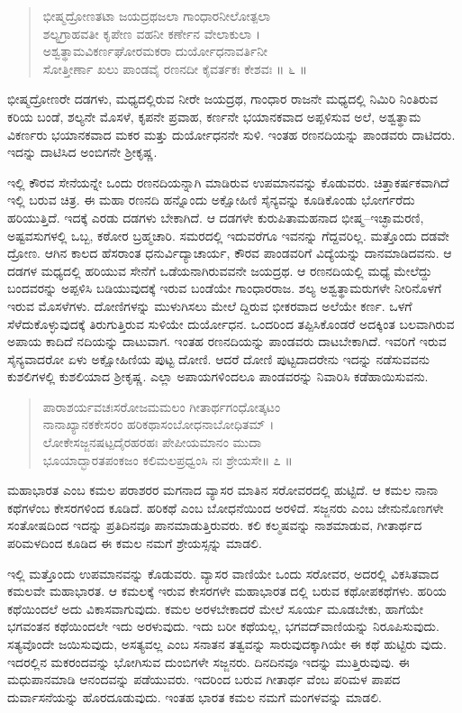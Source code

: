 \begin{verse}
ಭೀಷ್ಮದ್ರೋಣತಟಾ ಜಯದ್ರಥಜಲಾ ಗಾಂಧಾರನೀಲೋತ್ಪಲಾ\\ಶಲ್ಯಗ್ರಾಹವತೀ ಕೃಪೇಣ ವಹನೀ ಕರ್ಣೇನ ವೇಲಾಕುಲಾ ।\\ಅಶ್ವತ್ಥಾಮವಿಕರ್ಣಘೋರಮಕರಾ ದುರ್ಯೋಧನಾವರ್ತಿನೀ\\ಸೋತ್ತೀರ್ಣಾ ಖಲು ಪಾಂಡವೈ ರಣನದೀ ಕೈವರ್ತಕಃ ಕೇಶವಃ \num{॥ ೬ ॥}
\end{verse}

{\small ಭೀಷ್ಮದ್ರೋಣರೇ ದಡಗಳು, ಮಧ್ಯದಲ್ಲಿರುವ ನೀರೇ ಜಯದ್ರಥ, ಗಾಂಧಾರ ರಾಜನೇ ಮಧ್ಯದಲ್ಲಿ ನಿಮಿರಿ ನಿಂತಿರುವ ಕರಿಯ ಬಂಡೆ, ಶಲ್ಯನೇ ಮೊಸಳೆ, ಕೃಪನೇ ಪ್ರವಾಹ, ಕರ್ಣನೇ ಭಯಾನಕವಾದ ಅಪ್ಪಳಿಸುವ ಅಲೆ, ಅಶ್ವತ್ಥಾಮ ವಿಕರ್ಣರು ಭಯಾನಕವಾದ ಮಕರ ಮತ್ತು ದುರ್ಯೋಧನನೇ ಸುಳಿ. ಇಂತಹ ರಣನದಿಯನ್ನು ಪಾಂಡವರು ದಾಟಿದರು. ಇದನ್ನು ದಾಟಿಸಿದ ಅಂಬಿಗನೇ ಶ್ರೀಕೃಷ್ಣ.}

ಇಲ್ಲಿ ಕೌರವ ಸೇನೆಯನ್ನೇ ಒಂದು ರಣನದಿಯನ್ನಾಗಿ ಮಾಡಿರುವ ಉಪಮಾನವನ್ನು ಕೊಡುವರು. ಚಿತ್ತಾಕರ್ಷಕವಾಗಿದೆ ಇಲ್ಲಿ ಬರುವ ಚಿತ್ರ. ಈ ಮಹಾ ರಣನದಿ ಹನ್ನೊಂದು ಅಕ್ಷೋಹಿಣಿ ಸೈನ್ಯವನ್ನು ಕೂಡಿಕೊಂಡು ಭೋರ್ಗರೆದು ಹರಿಯುತ್ತಿದೆ. ಇದಕ್ಕೆ ಎರಡು ದಡಗಳು ಬೇಕಾಗಿದೆ. ಆ ದಡಗಳೇ ಕುರುಪಿತಾಮಹನಾದ ಭೀಷ್ಮ–ಇಚ್ಛಾಮರಣಿ, ಅಷ್ಟವಸುಗಳಲ್ಲಿ ಒಬ್ಬ, ಕಠೋರ ಬ್ರಹ್ಮಚಾರಿ. ಸಮರದಲ್ಲಿ ಇದುವರೆಗೂ ಇವನನ್ನು ಗೆದ್ದವರಿಲ್ಲ. ಮತ್ತೊಂದು ದಡವೇ ದ್ರೋಣ. ಆಗಿನ ಕಾಲದ ಹೆಸರಾಂತ ಧನುರ್ವಿದ್ಯಾಚಾರ್ಯ, ಕೌರವ ಪಾಂಡವರಿಗೆ ವಿದ್ಯೆಯನ್ನು ದಾನಮಾಡಿದವನು. ಆ ದಡಗಳ ಮಧ್ಯದಲ್ಲಿ ಹರಿಯುವ ಸೇನೆಗೆ ಒಡೆಯನಾಗಿರುವವನೇ ಜಯದ್ರಥ. ಆ ರಣನದಿಯಲ್ಲಿ ಮಧ್ಯೆ ಮೇಲೆದ್ದು ಬಂದವರನ್ನು ಅಪ್ಪಳಿಸಿ ಬಡಿಯುವುದಕ್ಕೆ ಇರುವ ಬಂಡೆಯೇ ಗಾಂಧಾರರಾಜ. ಶಲ್ಯ ಅಶ್ವತ್ಥಾಮರುಗಳೇ ನೀರಿನೊಳಗೆ ಇರುವ ಮೊಸಳೆಗಳು. ದೋಣಿಗಳನ್ನು ಮುಳುಗಿಸಲು ಮೇಲೆ ದ್ದಿರುವ ಭೀಕರವಾದ ಅಲೆಯೇ ಕರ್ಣ. ಒಳಗೆ ಸೆಳೆದುಕೊಳ್ಳುವುದಕ್ಕೆ ತಿರುಗುತ್ತಿರುವ ಸುಳಿಯೇ ದುರ್ಯೋಧನ. ಒಂದರಿಂದ ತಪ್ಪಿಸಿಕೊಂಡರೆ ಅದಕ್ಕಿಂತ ಬಲವಾಗಿರುವ ಅಪಾಯ ಕಾದಿದೆ ನದಿಯನ್ನು ದಾಟುವಾಗ. ಇಂತಹ ರಣನದಿಯನ್ನು ಪಾಂಡವರು ದಾಟಬೇಕಾಗಿದೆ. ಇವರಿಗೆ ಇರುವ ಸೈನ್ಯವಾದರೋ ಏಳು ಅಕ್ಷೋಹಿಣಿಯ ಪುಟ್ಟ ದೋಣಿ. ಆದರೆ ದೋಣಿ ಪುಟ್ಟದಾದರೇನು ಇದನ್ನು ನಡೆಸುವವನು ಕುಶಲಿಗಳಲ್ಲಿ ಕುಶಲಿಯಾದ ಶ್ರೀಕೃಷ್ಣ. ಎಲ್ಲಾ ಅಪಾಯಗಳಿಂದಲೂ ಪಾಂಡವರನ್ನು ನಿವಾರಿಸಿ ಕಡೆಹಾಯಿಸುವನು.

\begin{verse}
ಪಾರಾಶರ್ಯವಚಃಸರೋಜಮಮಲಂ ಗೀತಾರ್ಥಗಂಧೋತ್ಕಟಂ\\ನಾನಾಖ್ಯಾನಕಕೇಸರಂ ಹರಿಕಥಾಸಂಬೋಧನಾಬೋಧಿತಮ್ ।\\ಲೋಕೇಸಜ್ಜನಷಟ್ಪದೈರಹರಹಃ ಪೇಪೀಯಮಾನಂ ಮುದಾ\\ಭೂಯಾದ್ಭಾರತಪಂಕಜಂ ಕಲಿಮಲಪ್ರಧ್ವಂಸಿ ನಃ ಶ್ರೇಯಸೇ\num{॥ ೭ ॥}
\end{verse}

{\small ಮಹಾಭಾರತ ಎಂಬ ಕಮಲ ಪರಾಶರರ ಮಗನಾದ ವ್ಯಾಸರ ಮಾತಿನ ಸರೋವರದಲ್ಲಿ ಹುಟ್ಟಿದೆ. ಆ ಕಮಲ ನಾನಾ ಕಥೆಗಳೆಂಬ ಕೇಸರಗಳಿಂದ ಕೂಡಿದೆ. ಹರಿಕಥೆ ಎಂಬ ಬೋಧನೆಯಿಂದ ಅರಳಿದೆ. ಸಜ್ಜನರು ಎಂಬ ಜೇನುನೊಣಗಳೇ ಸಂತೋಷದಿಂದ ಇದನ್ನು ಪ್ರತಿದಿನವೂ ಪಾನಮಾಡುತ್ತಿರುವರು. ಕಲಿ ಕಲ್ಮಷವನ್ನು ನಾಶಮಾಡುವ, ಗೀತಾರ್ಥದ ಪರಿಮಳದಿಂದ ಕೂಡಿದ ಈ ಕಮಲ ನಮಗೆ ಶ್ರೇಯಸ್ಸನ್ನು ಮಾಡಲಿ.}

ಇಲ್ಲಿ ಮತ್ತೊಂದು ಉಪಮಾನವನ್ನು ಕೊಡುವರು. ವ್ಯಾಸರ ವಾಣಿಯೇ ಒಂದು ಸರೋವರ, ಅದರಲ್ಲಿ ವಿಕಸಿತವಾದ ಕಮಲವೇ ಮಹಾಭಾರತ. ಆ ಕಮಲಕ್ಕೆ ಇರುವ ಕೇಸರಗಳೇ ಮಹಾಭಾರತ ದಲ್ಲಿ ಬರುವ ಕಥೋಪಕಥೆಗಳು. ಹರಿಯ ಕಥೆಯಿಂದಲೆ ಅದು ವಿಕಾಸವಾಗುವುದು. ಕಮಲ ಅರಳಬೇಕಾದರೆ ಮೇಲೆ ಸೂರ್ಯ ಮೂಡಬೇಕು, ಹಾಗೆಯೇ ಭಗವಂತನ ಕಥೆಯಿಂದಲೇ ಇದು ಅರಳುವುದು. ಇದು ಬರೀ ಕಥೆಯಲ್ಲ, ಭಗವದ್​ವಾಣಿಯನ್ನು ನಿರೂಪಿಸುವುದು. ಸತ್ಯವೊಂದೇ ಜಯಿಸುವುದು, ಅಸತ್ಯವಲ್ಲ ಎಂಬ ಸನಾತನ ತತ್ವವನ್ನು ಸಾರುವುದಕ್ಕಾಗಿಯೇ ಈ ಕಥೆ ಹುಟ್ಟಿರು ವುದು. ಇದರಲ್ಲಿನ ಮಕರಂದವನ್ನು ಭೋಗಿಸುವ ದುಂಬಿಗಳೇ ಸಜ್ಜನರು. ದಿನದಿನವೂ ಇದನ್ನು ಮುತ್ತಿರುವುವು. ಈ ಮಧುಪಾನಮಾಡಿ ಆನಂದವನ್ನು ಪಡೆಯುವರು. ಇದರಿಂದ ಬರುವ ಗೀತಾರ್ಥ ವೆಂಬ ಪರಿಮಳ ಪಾಪದ ದುರ್ವಾಸನೆಯನ್ನು ಹೊರದೂಡುವುದು. ಇಂತಹ ಭಾರತ ಕಮಲ ನಮಗೆ ಮಂಗಳವನ್ನು ಮಾಡಲಿ.

